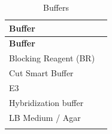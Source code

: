 \documentclass[11pt,singlespacinge,twoside]{reedthesis} %
\begin{document}
\begin{longtable}[]{@{}ll@{}}
\caption{\label{tab:mat-buff} Buffers}\tabularnewline
\toprule
\begin{minipage}[b]{0.26\columnwidth}\raggedright
\textbf{Buffer}\strut
\end{minipage} & \begin{minipage}[b]{0.68\columnwidth}\raggedright
\strut
\end{minipage}\tabularnewline
\midrule
\endfirsthead
\toprule
\begin{minipage}[b]{0.26\columnwidth}\raggedright
\textbf{Buffer}\strut
\end{minipage} & \begin{minipage}[b]{0.68\columnwidth}\raggedright
\strut
\end{minipage}\tabularnewline
\midrule
\endhead
\begin{minipage}[t]{0.26\columnwidth}\raggedright
Blocking Reagent (BR)\strut
\end{minipage} & \begin{minipage}[t]{0.68\columnwidth}\raggedright
\strut
\end{minipage}\tabularnewline
\begin{minipage}[t]{0.26\columnwidth}\raggedright
Cut Smart Buffer\strut
\end{minipage} & \begin{minipage}[t]{0.68\columnwidth}\raggedright
\strut
\end{minipage}\tabularnewline
\begin{minipage}[t]{0.26\columnwidth}\raggedright
E3\strut
\end{minipage} & \begin{minipage}[t]{0.68\columnwidth}\raggedright
\strut
\end{minipage}\tabularnewline
\begin{minipage}[t]{0.26\columnwidth}\raggedright
Hybridization buffer\strut
\end{minipage} & \begin{minipage}[t]{0.68\columnwidth}\raggedright
\strut
\end{minipage}\tabularnewline
\begin{minipage}[t]{0.26\columnwidth}\raggedright
LB Medium / Agar\strut
\end{minipage} & \begin{minipage}[t]{0.68\columnwidth}\raggedright
\strut
\end{minipage}\tabularnewline
\begin{minipage}[t]{0.26\columnwidth}\raggedright

\end{minipage}
\end{longtable}
\end{document}
